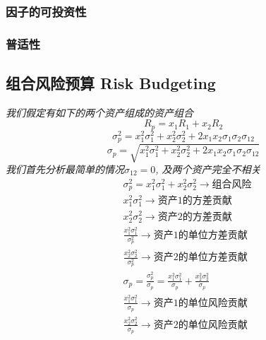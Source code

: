 \documentclass{scrartcl}
\numberwithin{equation}{section}
\begin{document}
\subsubsection{因子的可投资性}
\subsubsection{普适性}
\subsection{组合风险预算 Risk Budgeting}
\textsl{我们假定有如下的两个资产组成的资产组合}
$$ R_p = x_1 R_1 + x_2 R_2 $$
$$\sigma_p^2 = x_1^2 \sigma_1^2 + x_2^2 \sigma_2^2 + 2x_1 x_2 \sigma_1 \sigma_2 \sigma_{12}$$
$$\sigma_p = \sqrt{x_1^2 \sigma_1^2 + x_2^2 \sigma_2^2 + 2x_1 x_2 \sigma_1 \sigma_2 \sigma_{12}}$$
\textsl{我们首先分析最简单的情况$ \sigma_{12} = 0 $, 及两个资产完全不相关}
\begin{equation}
    \begin{aligned}
         & \sigma_p^2 = x_1^2 \sigma_1^2 + x_2^2 \sigma_2^2  \rightarrow  组合风险                                                 \\
         & x_1^2 \sigma_1^2 \rightarrow  资产1 的方差贡献                                                                          \\
         & x_2^2 \sigma_2^2 \rightarrow  资产2 的方差贡献                                                                          \\
         & \frac {x_1^2 \sigma_1^2 }{ \sigma_p^2} \rightarrow 资产1的单位方差贡献                                                  \\
         & \frac {x_2^2 \sigma_2^2 }{ \sigma_p^2} \rightarrow  资产2的单位方差贡献                                                 \\
         & \sigma_p = \frac {\sigma_p^2} {\sigma_p} =  \frac {x_1^2 \sigma_1^2 }{ \sigma_p} + \frac {x_2^2 \sigma_2^2 }{ \sigma_p} \\
         & \frac {x_1^2 \sigma_1^2 }{ \sigma_p}  \rightarrow  资产1的单位风险贡献                                                  \\
         & \frac {x_2^2 \sigma_2^2 }{ \sigma_p}  \rightarrow  资产2的单位风险贡献
    \end{aligned}
\end{equation}
\end{document}
